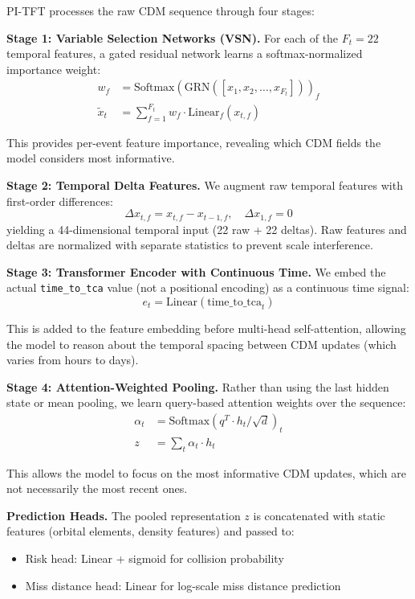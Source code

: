 \documentclass{article}
\begin{document}
PI-TFT processes the raw CDM sequence through four stages:

\textbf{Stage 1: Variable Selection Networks (VSN).}
For each of the $F_t = 22$ temporal features, a gated residual network learns a softmax-normalized importance weight:
\begin{align}
w_f &= \text{Softmax}(\text{GRN}([x_1, x_2, \ldots, x_{F_t}]))_f \label{eq:vsn1} \\
\tilde{x}_t &= \sum_{f=1}^{F_t} w_f \cdot \text{Linear}_f(x_{t,f}) \label{eq:vsn2}
\end{align}

This provides per-event feature importance, revealing which CDM fields the model considers most informative.

\textbf{Stage 2: Temporal Delta Features.}
We augment raw temporal features with first-order differences:
\begin{equation}
\Delta x_{t,f} = x_{t,f} - x_{t-1,f}, \quad \Delta x_{1,f} = 0
\label{eq:delta}
\end{equation}
yielding a 44-dimensional temporal input (22 raw + 22 deltas). Raw features and deltas are normalized with separate statistics to prevent scale interference.

\textbf{Stage 3: Transformer Encoder with Continuous Time.}
We embed the actual \texttt{time\_to\_tca} value (not a positional encoding) as a continuous time signal:
\begin{equation}
e_t = \text{Linear}(\text{time\_to\_tca}_t)
\label{eq:time}
\end{equation}

This is added to the feature embedding before multi-head self-attention, allowing the model to reason about the temporal spacing between CDM updates (which varies from hours to days).

\textbf{Stage 4: Attention-Weighted Pooling.}
Rather than using the last hidden state or mean pooling, we learn query-based attention weights over the sequence:
\begin{align}
\alpha_t &= \text{Softmax}(q^T \cdot h_t / \sqrt{d})_t \label{eq:attn1} \\
z &= \sum_t \alpha_t \cdot h_t \label{eq:attn2}
\end{align}

This allows the model to focus on the most informative CDM updates, which are not necessarily the most recent ones.

\textbf{Prediction Heads.}
The pooled representation $z$ is concatenated with static features (orbital elements, density features) and passed to:
\begin{itemize}
\item Risk head: Linear + sigmoid for collision probability
\item Miss distance head: Linear for log-scale miss distance prediction
\end{itemize}
\end{document}
